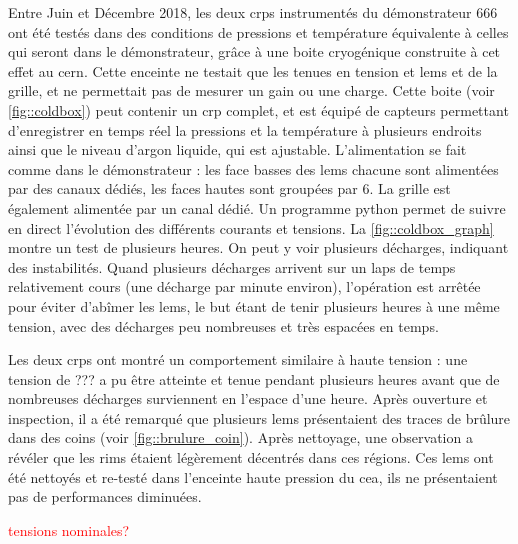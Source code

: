         Entre Juin et Décembre 2018, les deux \glspl{crp} instrumentés du démonstrateur 666 ont été testés dans des conditions de pressions et température équivalente à celles qui seront dans le démonstrateur, grâce à une boite cryogénique construite à cet effet au \gls{cern}. Cette enceinte ne testait que les tenues en tension et \glspl{lem} et de la grille, et ne permettait pas de mesurer un gain ou une charge. Cette boite (voir \autoref{fig::coldbox}) peut contenir un \gls{crp} complet, et est équipé de capteurs permettant d'enregistrer en temps réel la pressions et la température à plusieurs endroits ainsi que le niveau d'argon liquide, qui est ajustable. L'alimentation se fait comme dans le démonstrateur : les face basses des \glspl{lem} chacune sont alimentées par des canaux dédiés, les faces hautes sont groupées par 6. La grille est également alimentée par un canal dédié. Un programme python permet de suivre en direct l'évolution des différents courants et tensions. La \autoref{fig::coldbox_graph} montre un test de plusieurs heures. On peut y voir plusieurs décharges, indiquant des instabilités. Quand plusieurs décharges arrivent sur un laps de temps relativement cours (une décharge par minute environ), l'opération est arrêtée pour éviter d'abîmer les \glspl{lem}, le but étant de tenir plusieurs heures à une même tension, avec des décharges peu nombreuses et très espacées en temps.
        
        Les deux \glspl{crp} ont montré un comportement similaire à haute tension : une tension de ??? a pu être atteinte et tenue pendant plusieurs heures avant que de nombreuses décharges surviennent en l'espace d'une heure. Après ouverture et inspection, il a été remarqué que plusieurs \glspl{lem} présentaient des traces de brûlure dans des coins (voir \autoref{fig::brulure_coin}). Après nettoyage, une observation a révéler que les rims étaient légèrement décentrés dans ces régions. Ces \glspl{lem} ont été nettoyés et re-testé dans l'enceinte haute pression du \gls{cea}, ils ne présentaient pas de performances diminuées.
        
        \textcolor{red}{tensions nominales?}
